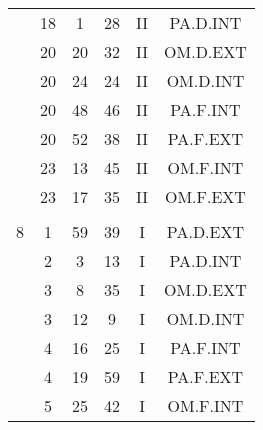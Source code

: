 \documentclass[12pt, a4paper]{article}
\begin{document}
\begin{multicols}{3}
{\begin{tabular}{c c c c c c}
	 	 	 	 & 18 & 1 & 28 & II & PA.D.INT\\%
	 	 	 	 & 20 & 20 & 32 & II & OM.D.EXT\\%
	 	 	 	 & 20 & 24 & 24 & II & OM.D.INT\\%
	 	 	 	 & 20 & 48 & 46 & II & PA.F.INT\\%
	 	 	 	 & 20 & 52 & 38 & II & PA.F.EXT\\%
	 	 	 	 & 23 & 13 & 45 & II & OM.F.INT\\%
	 	 	 	 & 23 & 17 & 35 & II & OM.F.EXT\\%
	 	 	 	 & & & & & \\%
	 	 	 	8 & 1 & 59 & 39 & I & PA.D.EXT\\%
	 	 	 	 & 2 & 3 & 13 & I & PA.D.INT\\%
	 	 	 	 & 3 & 8 & 35 & I & OM.D.EXT\\%
	 	 	 	 & 3 & 12 & 9 & I & OM.D.INT\\%
	 	 	 	 & 4 & 16 & 25 & I & PA.F.INT\\%
	 	 	 	 & 4 & 19 & 59 & I & PA.F.EXT\\%
	 	 	 	 & 5 & 25 & 42 & I & OM.F.INT\\%
	 	 \end{tabular}
 	}
\end{multicols}
\end{document}
